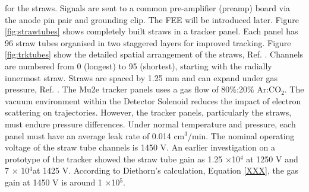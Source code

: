 for the straws. 
Signals are sent to a common pre-amplifier (preamp) board via the anode pin pair and grounding clip. 
The FEE will be introduced later. Figure \ref{fig:strawtubes} shows completely built straws in a tracker panel. 
Each panel has 96 straw tubes organised in two staggered layers for improved tracking. Figure \ref{fig:trktubes} 
show the detailed spatial arrangement of the straws, Ref. \cite{trk}. Channels are numbered from 0 (longest) 
to 95 (shortest), starting with the radially innermost straw.
Straws are spaced by 1.25 mm and can expand under gas pressure, Ref. \cite{bartoszek2015mu2e}.
The Mu2e tracker panels uses a gas flow of 80\%:20\% Ar:CO$_2$. 
The vacuum environment within the Detector Solenoid reduces the impact of electron scattering on trajectories. 
However, the tracker panels, particularly the straws, must endure pressure differences. Under normal temperature 
and pressure, each panel must have an average leak rate of 0.014 cm$^3$/min. The nominal operating voltage of 
the straw tube channels is 1450 V. An earlier investigation on a prototype of the tracker showed the straw tube 
gain as 1.25 $\times$10$^4$ at 1250 V and 7 $\times$ 10$^4$at 1425 V. According to Diethorn's calculation, Equation \ref{XXX}, 
the gas gain at 1450 V is around 1 $\times$10$^5$.

